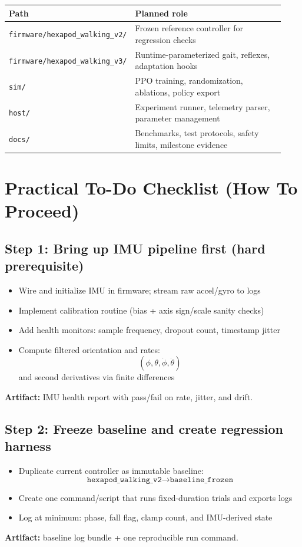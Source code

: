 \documentclass[11pt]{article}
\begin{document}
\begin{longtable}{>{\raggedright\arraybackslash}p{0.25\linewidth} >{\raggedright\arraybackslash}p{0.68\linewidth}}
\toprule
\textbf{Path} & \textbf{Planned role} \\
\midrule
\endhead
\texttt{firmware/hexapod\_walking\_v2/} & Frozen reference controller for regression checks \\
\texttt{firmware/hexapod\_walking\_v3/} & Runtime-parameterized gait, reflexes, adaptation hooks \\
\texttt{sim/} & PPO training, randomization, ablations, policy export \\
\texttt{host/} & Experiment runner, telemetry parser, parameter management \\
\texttt{docs/} & Benchmarks, test protocols, safety limits, milestone evidence \\
\bottomrule
\end{longtable}

\section{Practical To-Do Checklist (How To Proceed)}

\subsection*{Step 1: Bring up IMU pipeline first (hard prerequisite)}
\begin{itemize}
    \item Wire and initialize IMU in firmware; stream raw accel/gyro to logs
    \item Implement calibration routine (bias + axis sign/scale sanity checks)
    \item Add health monitors: sample frequency, dropout count, timestamp jitter
    \item Compute filtered orientation and rates:
    \[
    (\phi,\theta,\dot{\phi},\dot{\theta})
    \]
    and second derivatives via finite differences
\end{itemize}
\textbf{Artifact:} IMU health report with pass/fail on rate, jitter, and drift.

\subsection*{Step 2: Freeze baseline and create regression harness}
\begin{itemize}
    \item Duplicate current controller as immutable baseline:
    \[
    \texttt{hexapod\_walking\_v2} \rightarrow \texttt{baseline\_frozen}
    \]
    \item Create one command/script that runs fixed-duration trials and exports logs
    \item Log at minimum: phase, fall flag, clamp count, and IMU-derived state
\end{itemize}
\textbf{Artifact:} baseline log bundle + one reproducible run command.
\end{document}

